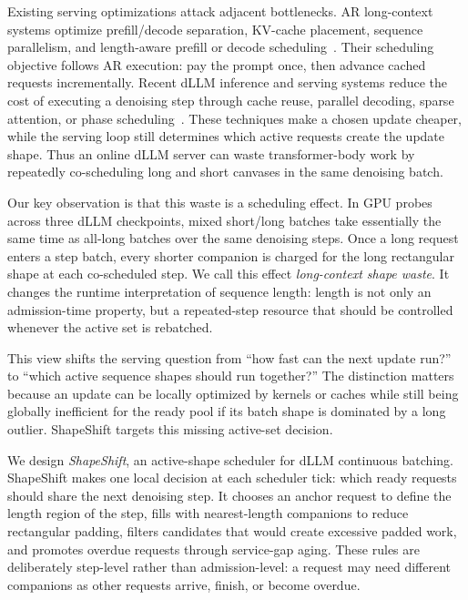 \documentclass[letterpaper]{article} \usepackage[submission]{aaai2027} \usepackage[hyphens]{url} \usepackage{graphicx} \usepackage{subcaption} \urlstyle{rm} \def\UrlFont{\rm} \usepackage{natbib} \usepackage{amsmath} \usepackage{amssymb} \usepackage{booktabs} \usepackage{multirow} \usepackage{algorithm} \usepackage{algorithmic}
\begin{document}
Existing serving optimizations attack adjacent bottlenecks. AR long-context systems optimize prefill/decode separation, KV-cache placement, sequence parallelism, and length-aware prefill or decode scheduling~\cite{loongserve2024,alignedserve2026,laps2026}. Their scheduling objective follows AR execution: pay the prompt once, then advance cached requests incrementally. Recent dLLM inference and serving systems reduce the cost of executing a denoising step through cache reuse, parallel decoding, sparse attention, or phase scheduling~\cite{zhao2025fastdllm,dInfer2025,dllmserve2025}. These techniques make a chosen update cheaper, while the serving loop still determines which active requests create the update shape. Thus an online dLLM server can waste transformer-body work by repeatedly co-scheduling long and short canvases in the same denoising batch.

Our key observation is that this waste is a scheduling effect. In GPU probes across three dLLM checkpoints, mixed short/long batches take essentially the same time as all-long batches over the same denoising steps. Once a long request enters a step batch, every shorter companion is charged for the long rectangular shape at each co-scheduled step. We call this effect \emph{long-context shape waste}. It changes the runtime interpretation of sequence length: length is not only an admission-time property, but a repeated-step resource that should be controlled whenever the active set is rebatched.

This view shifts the serving question from ``how fast can the next update run?'' to ``which active sequence shapes should run together?'' The distinction matters because an update can be locally optimized by kernels or caches while still being globally inefficient for the ready pool if its batch shape is dominated by a long outlier. ShapeShift targets this missing active-set decision.

We design \emph{ShapeShift}, an active-shape scheduler for dLLM continuous batching. ShapeShift makes one local decision at each scheduler tick: which ready requests should share the next denoising step. It chooses an anchor request to define the length region of the step, fills with nearest-length companions to reduce rectangular padding, filters candidates that would create excessive padded work, and promotes overdue requests through service-gap aging. These rules are deliberately step-level rather than admission-level: a request may need different companions as other requests arrive, finish, or become overdue.
\end{document}
